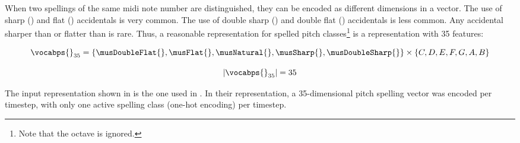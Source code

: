 
When two spellings of the same \gls{midi} note number are
distinguished, they can be encoded as different dimensions
in a vector. The use of sharp (\musSharp{}) and flat
(\musFlat{}) accidentals is very common. The use of double
sharp (\musDoubleSharp{}) and double flat (\musDoubleFlat{})
accidentals is less common. Any accidental sharper than
\musDoubleSharp{} or flatter than \musDoubleFlat{} is rare.
Thus, a reasonable representation for spelled pitch
classes\footnote{Note that the octave is ignored.} is a
representation with 35 features:

\begin{equation}
    \label{eq:pitch_spelling_35}
    \vocabps{}_{35} = \{\musDoubleFlat{}, \musFlat{}, 
    \musNatural{}, \musSharp{}, \musDoubleSharp{} \}
    \times 
    \{C, D, E, F, G, A, B \}
\end{equation}

\begin{equation}
    \label{eq:pitch_spelling_35_magnitude}
    | \vocabps{}_{35} | = 35
\end{equation}

The input representation shown in 
is the one used in \textcite{micchi2020not, micchi2021deep}.
In their representation, a 35-dimensional pitch spelling
vector was encoded per timestep, with only one active
spelling class (one-hot encoding) per timestep.
